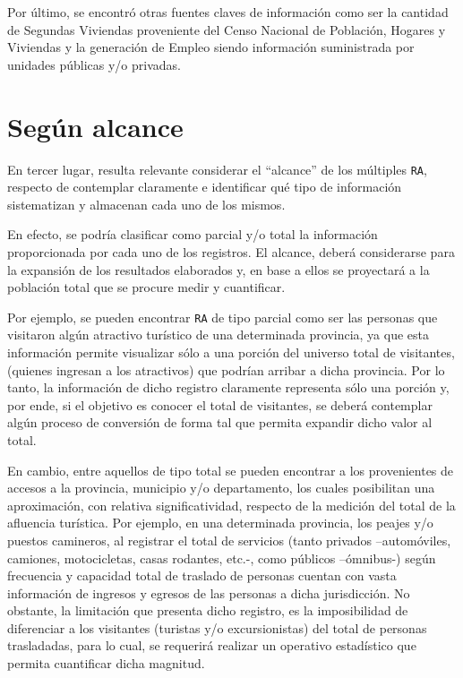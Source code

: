 \documentclass[
]{book}
\begin{document}
Por último, se encontró otras fuentes claves de información como ser la cantidad de Segundas Viviendas proveniente del Censo Nacional de Población, Hogares y Viviendas y la generación de Empleo siendo información suministrada por unidades públicas y/o privadas.

\hypertarget{seguxfan-alcance}{%
\section{Según alcance}\label{seguxfan-alcance}}

En tercer lugar, resulta relevante considerar el ``alcance'' de los múltiples \texttt{RA}, respecto de contemplar claramente e identificar qué tipo de información sistematizan y almacenan cada uno de los mismos.

En efecto, se podría clasificar como parcial y/o total la información proporcionada por cada uno de los registros. El alcance, deberá considerarse para la expansión de los resultados elaborados y, en base a ellos se proyectará a la población total que se procure medir y cuantificar.

Por ejemplo, se pueden encontrar \texttt{RA} de tipo parcial como ser las personas que visitaron algún atractivo turístico de una determinada provincia, ya que esta información permite visualizar sólo a una porción del universo total de visitantes, (quienes ingresan a los atractivos) que podrían arribar a dicha provincia. Por lo tanto, la información de dicho registro claramente representa sólo una porción y, por ende, si el objetivo es conocer el total de visitantes, se deberá contemplar algún proceso de conversión de forma tal que permita expandir dicho valor al total.

En cambio, entre aquellos de tipo total se pueden encontrar a los provenientes de accesos a la provincia, municipio y/o departamento, los cuales posibilitan una aproximación, con relativa significatividad, respecto de la medición del total de la afluencia turística. Por ejemplo, en una determinada provincia, los peajes y/o puestos camineros, al registrar el total de servicios (tanto privados --automóviles, camiones, motocicletas, casas rodantes, etc.-, como públicos --ómnibus-) según frecuencia y capacidad total de traslado de personas cuentan con vasta información de ingresos y egresos de las personas a dicha jurisdicción. No obstante, la limitación que presenta dicho registro, es la imposibilidad de diferenciar a los visitantes (turistas y/o excursionistas) del total de personas trasladadas, para lo cual, se requerirá realizar un operativo estadístico que permita cuantificar dicha magnitud.\\
\end{document}
